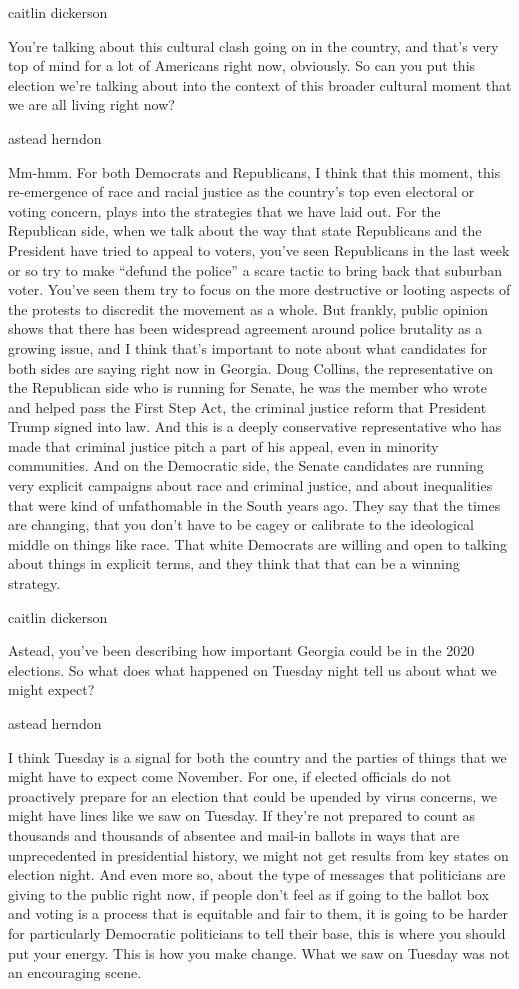 caitlin dickerson

You're talking about this cultural clash going on in the country, and
that's very top of mind for a lot of Americans right now, obviously. So
can you put this election we're talking about into the context of this
broader cultural moment that we are all living right now?

astead herndon

Mm-hmm. For both Democrats and Republicans, I think that this moment,
this re-emergence of race and racial justice as the country's top even
electoral or voting concern, plays into the strategies that we have laid
out. For the Republican side, when we talk about the way that state
Republicans and the President have tried to appeal to voters, you've
seen Republicans in the last week or so try to make ``defund the
police'' a scare tactic to bring back that suburban voter. You've seen
them try to focus on the more destructive or looting aspects of the
protests to discredit the movement as a whole. But frankly, public
opinion shows that there has been widespread agreement around police
brutality as a growing issue, and I think that's important to note about
what candidates for both sides are saying right now in Georgia. Doug
Collins, the representative on the Republican side who is running for
Senate, he was the member who wrote and helped pass the First Step Act,
the criminal justice reform that President Trump signed into law. And
this is a deeply conservative representative who has made that criminal
justice pitch a part of his appeal, even in minority communities. And on
the Democratic side, the Senate candidates are running very explicit
campaigns about race and criminal justice, and about inequalities that
were kind of unfathomable in the South years ago. They say that the
times are changing, that you don't have to be cagey or calibrate to the
ideological middle on things like race. That white Democrats are willing
and open to talking about things in explicit terms, and they think that
that can be a winning strategy.

caitlin dickerson

Astead, you've been describing how important Georgia could be in the
2020 elections. So what does what happened on Tuesday night tell us
about what we might expect?

astead herndon

I think Tuesday is a signal for both the country and the parties of
things that we might have to expect come November. For one, if elected
officials do not proactively prepare for an election that could be
upended by virus concerns, we might have lines like we saw on Tuesday.
If they're not prepared to count as thousands and thousands of absentee
and mail-in ballots in ways that are unprecedented in presidential
history, we might not get results from key states on election night. And
even more so, about the type of messages that politicians are giving to
the public right now, if people don't feel as if going to the ballot box
and voting is a process that is equitable and fair to them, it is going
to be harder for particularly Democratic politicians to tell their base,
this is where you should put your energy. This is how you make change.
What we saw on Tuesday was not an encouraging scene.


